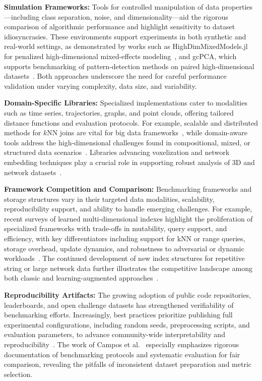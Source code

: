 \documentclass[sigconf]{acmart}
\begin{document}
\textbf{Simulation Frameworks:} Tools for controlled manipulation of data properties—including class separation, noise, and dimensionality—aid the rigorous comparison of algorithmic performance and highlight sensitivity to dataset idiosyncrasies. These environments support experiments in both synthetic and real-world settings, as demonstrated by works such as HighDimMixedModels.jl for penalized high-dimensional mixed-effects modeling~\cite{ref100}, and gcPCA, which supports benchmarking of pattern-detection methods on paired high-dimensional datasets~\cite{ref99}. Both approaches underscore the need for careful performance validation under varying complexity, data size, and variability.

\textbf{Domain-Specific Libraries:} Specialized implementations cater to modalities such as time series, trajectories, graphs, and point clouds, offering tailored distance functions and evaluation protocols. For example, scalable and distributed methods for $k$NN joins are vital for big data frameworks~\cite{ref75}, while domain-aware tools address the high-dimensional challenges found in compositional, mixed, or structured data scenarios~\cite{ref92, ref93, ref94}. Libraries advancing voxelization and network embedding techniques play a crucial role in supporting robust analysis of 3D and network datasets~\cite{ref86, ref40}.

\textbf{Framework Competition and Comparison:} Benchmarking frameworks and storage structures vary in their targeted data modalities, scalability, reproducibility support, and ability to handle emerging challenges. For example, recent surveys of learned multi-dimensional indexes highlight the proliferation of specialized frameworks with trade-offs in mutability, query support, and efficiency, with key differentiators including support for kNN or range queries, storage overhead, update dynamics, and robustness to adversarial or dynamic workloads~\cite{ref110}. The continued development of new index structures for repetitive string or large network data further illustrates the competitive landscape among both classic and learning-augmented approaches~\cite{ref30, ref38, ref87, ref110}.

\textbf{Reproducibility Artifacts:} The growing adoption of public code repositories, leaderboards, and open challenge datasets has strengthened verifiability of benchmarking efforts. Increasingly, best practices prioritize publishing full experimental configurations, including random seeds, preprocessing scripts, and evaluation parameters, to advance community-wide interpretability and reproducibility~\cite{ref14, ref44, ref64, ref80, ref81, ref91, ref95, ref99}. The work of Campos et al.~\cite{ref14} especially emphasizes rigorous documentation of benchmarking protocols and systematic evaluation for fair comparison, revealing the pitfalls of inconsistent dataset preparation and metric selection.
\end{document}
